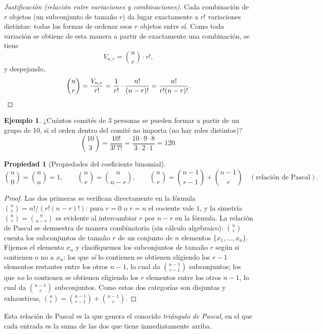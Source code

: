 \documentclass[11pt,a4paper]{article}
\theoremstyle{plain}
\newtheorem{propiedad}[teorema]{Propiedad}
\theoremstyle{definition}
\newtheorem{ejemplo}[teorema]{Ejemplo}
\theoremstyle{remark}
\begin{document}
\begin{proof}[Justificación (relación entre variaciones y combinaciones)]
Cada combinación de $r$ objetos (un subconjunto de tamaño $r$) da lugar exactamente a $r!$ variaciones distintas: todas las formas de ordenar esos $r$ objetos entre sí. Como toda variación se obtiene de esta manera a partir de exactamente una combinación, se tiene
\[
V_{n,r} = \binom{n}{r} \cdot r!,
\]
y despejando,
\[
\binom{n}{r} = \frac{V_{n,r}}{r!} = \frac{1}{r!}\cdot\frac{n!}{(n-r)!} = \frac{n!}{r!(n-r)!}. \qedhere
\]
\end{proof}

\begin{ejemplo}
¿Cuántos comités de 3 personas se pueden formar a partir de un grupo de 10, si el orden dentro del comité no importa (no hay roles distintos)?
\[
\binom{10}{3} = \frac{10!}{3!\,7!} = \frac{10\cdot 9\cdot 8}{3\cdot 2\cdot 1} = 120.
\]
\end{ejemplo}

\begin{propiedad}[Propiedades del coeficiente binomial]
\[
\binom{n}{0}=\binom{n}{n}=1, \qquad \binom{n}{r}=\binom{n}{n-r}, \qquad \binom{n}{r}=\binom{n-1}{r-1}+\binom{n-1}{r} \quad (\text{relación de Pascal}).
\]
\end{propiedad}

\begin{proof}
Las dos primeras se verifican directamente en la fórmula $\binom{n}{r}=n!/(r!(n-r)!)$: para $r=0$ o $r=n$ el cociente vale $1$, y la simetría $\binom{n}{r}=\binom{n}{n-r}$ es evidente al intercambiar $r$ por $n-r$ en la fórmula. La relación de Pascal se demuestra de manera combinatoria (sin cálculo algebraico): $\binom{n}{r}$ cuenta los subconjuntos de tamaño $r$ de un conjunto de $n$ elementos $\{x_1,\dots,x_n\}$. Fijemos el elemento $x_n$ y clasifiquemos los subconjuntos de tamaño $r$ según si contienen o no a $x_n$: los que \emph{sí} lo contienen se obtienen eligiendo los $r-1$ elementos restantes entre los otros $n-1$, lo cual da $\binom{n-1}{r-1}$ subconjuntos; los que \emph{no} lo contienen se obtienen eligiendo los $r$ elementos entre los otros $n-1$, lo cual da $\binom{n-1}{r}$ subconjuntos. Como estas dos categorías son disjuntas y exhaustivas, $\binom{n}{r}=\binom{n-1}{r-1}+\binom{n-1}{r}$.
\end{proof}

Esta relación de Pascal es la que genera el conocido \emph{triángulo de Pascal}, en el que cada entrada es la suma de las dos que tiene inmediatamente arriba.
\end{document}
